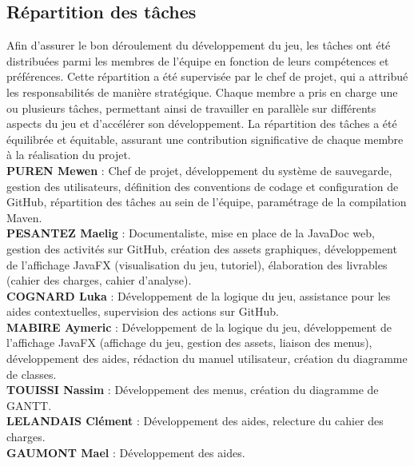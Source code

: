 \subsection{Répartition des tâches}

Afin d'assurer le bon déroulement du développement du jeu, les tâches ont été distribuées parmi les membres de l'équipe en fonction de leurs compétences et préférences. Cette répartition a été supervisée par le chef de projet, qui a attribué les responsabilités de manière stratégique. Chaque membre a pris en charge une ou plusieurs tâches, permettant ainsi de travailler en parallèle sur différents aspects du jeu et d'accélérer son développement. La répartition des tâches a été équilibrée et équitable, assurant une contribution significative de chaque membre à la réalisation du projet. \\

\textbf{PUREN Mewen} : Chef de projet, développement du système de sauvegarde, gestion des utilisateurs, définition des conventions de codage et configuration de GitHub, répartition des tâches au sein de l’équipe, paramétrage de la compilation Maven. \\

\textbf{PESANTEZ Maelig} : Documentaliste, mise en place de la JavaDoc web, gestion des activités sur GitHub, création des assets graphiques, développement de l’affichage JavaFX (visualisation du jeu, tutoriel), élaboration des livrables (cahier des charges, cahier d’analyse). \\

\textbf{COGNARD Luka} : Développement de la logique du jeu, assistance pour les aides contextuelles, supervision des actions sur GitHub. \\

\textbf{MABIRE Aymeric} : Développement de la logique du jeu, développement de l’affichage JavaFX (affichage du jeu, gestion des assets, liaison des menus), développement des aides, rédaction du manuel utilisateur, création du diagramme de classes. \\

\textbf{TOUISSI Nassim} : Développement des menus, création du diagramme de GANTT. \\

\textbf{LELANDAIS Clément} : Développement des aides, relecture du cahier des charges. \\

\textbf{GAUMONT Mael} : Développement des aides.